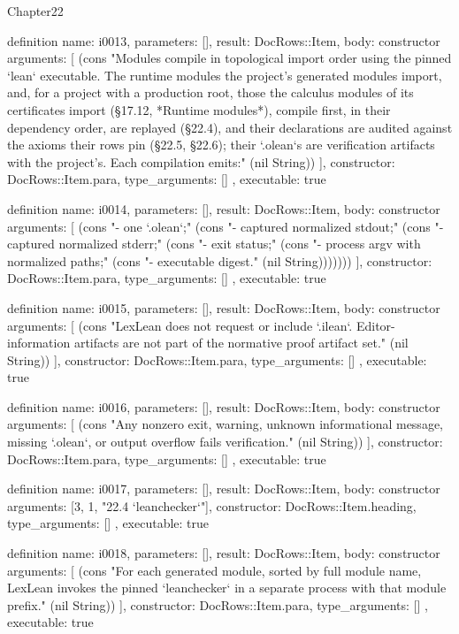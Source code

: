 \begin{lexlean}{Chapter22}
\begin{semanticmodule}
definition{
  name: i0013,
  parameters: [],
  result: DocRows::Item,
  body: constructor{
    arguments: [
      (cons "Modules compile in topological import order using the pinned `lean` executable. The runtime modules the project's generated modules import, and, for a project with a production root, those the calculus modules of its certificates import (§17.12, *Runtime modules*), compile first, in their dependency order, are replayed (§22.4), and their declarations are audited against the axioms their rows pin (§22.5, §22.6); their `.olean`s are verification artifacts with the project's. Each compilation emits:" (nil String))
    ],
    constructor: DocRows::Item.para,
    type_arguments: []
  },
  executable: true
}

definition{
  name: i0014,
  parameters: [],
  result: DocRows::Item,
  body: constructor{
    arguments: [
      (cons "- one `.olean`;" (cons "- captured normalized stdout;" (cons "- captured normalized stderr;" (cons "- exit status;" (cons "- process argv with normalized paths;" (cons "- executable digest." (nil String)))))))
    ],
    constructor: DocRows::Item.para,
    type_arguments: []
  },
  executable: true
}

definition{
  name: i0015,
  parameters: [],
  result: DocRows::Item,
  body: constructor{
    arguments: [
      (cons "LexLean does not request or include `.ilean`. Editor-information artifacts are not part of the normative proof artifact set." (nil String))
    ],
    constructor: DocRows::Item.para,
    type_arguments: []
  },
  executable: true
}

definition{
  name: i0016,
  parameters: [],
  result: DocRows::Item,
  body: constructor{
    arguments: [
      (cons "Any nonzero exit, warning, unknown informational message, missing `.olean`, or output overflow fails verification." (nil String))
    ],
    constructor: DocRows::Item.para,
    type_arguments: []
  },
  executable: true
}

definition{
  name: i0017,
  parameters: [],
  result: DocRows::Item,
  body: constructor{
    arguments: [3, 1, "22.4 `leanchecker`"],
    constructor: DocRows::Item.heading,
    type_arguments: []
  },
  executable: true
}

definition{
  name: i0018,
  parameters: [],
  result: DocRows::Item,
  body: constructor{
    arguments: [
      (cons "For each generated module, sorted by full module name, LexLean invokes the pinned `leanchecker` in a separate process with that module prefix." (nil String))
    ],
    constructor: DocRows::Item.para,
    type_arguments: []
  },
  executable: true
}


\end{semanticmodule}
\end{lexlean}
